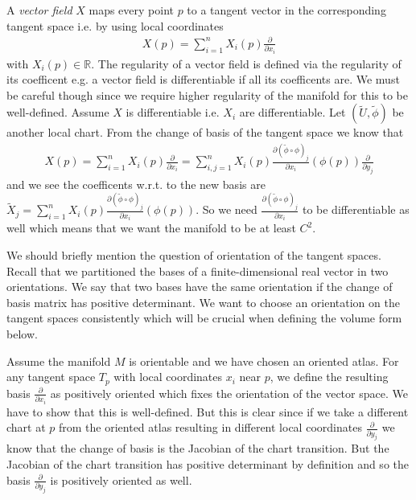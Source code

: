 \documentclass[12pt,a4paper]{article}
\numberwithin{equation}{subsection}
\numberwithin{lemma}{subsection}
\theoremstyle{definition}
\newcommand{\real}{\mathbb{R}}
\begin{document}
A \textit{vector field} $X$ maps every point $p$ to a tangent vector 
in the corresponding tangent space i.e. by using local coordinates
\begin{align*}
    X(p) = \sum_{i=1}^n X_i(p) \frac{\partial}{\partial x_i}
\end{align*}
with $X_i(p) \in \real$. The regularity of a vector field is defined via the
regularity of its coefficent e.g. a vector field is differentiable if 
all its coefficents are. We must be careful though since we require higher 
regularity of the manifold for this to be well-defined. 
Assume $X$ is differentiable i.e. $X_i$ are differentiable. 
Let $(\tilde{U}, \tilde{\phi})$ 
be another local chart.
From the 
change of basis of the tangent space we know that 
\begin{align*}
    X(p) = \sum_{i=1}^n X_i(p) \frac{\partial}{\partial x_i}
    = \sum_{i,j=1}^n X_i(p) \frac{\partial (\tilde{\phi} \circ \phi)_j}{\partial x_i}(\phi(p))
        \frac{\partial}{\partial y_j}
\end{align*}
and we see the coefficents w.r.t. to the new basis are 
$\tilde{X}_j = \sum_{i=1}^n X_i(p) \frac{\partial (\tilde{\phi} \circ \phi)_j}{\partial x_i}(\phi(p))$.
So we need $\frac{\partial (\tilde{\phi} \circ \phi)_j}{\partial x_i}$ to be 
differentiable as well which means that we want the manifold to be at least $C^2$.

We should briefly mention the question of orientation of the tangent spaces.
Recall that we partitioned the bases of a finite-dimensional real vector 
in two orientations. We say that two bases have the same 
orientation if the change of basis matrix has positive determinant.
We want to choose an orientation on the tangent spaces consistently which 
will be crucial when defining the volume form below.

Assume the manifold $M$ is orientable and we have chosen an oriented atlas.
For any tangent space $T_p$ with local coordinates $x_i$ near $p$, 
we define the resulting basis $\frac{\partial}{\partial x_i}$ as positively
oriented which fixes the orientation of the vector space. We have to show 
that this is well-defined. But this is clear since if we take a different 
chart at $p$ from the oriented atlas resulting in different local coordinates 
$\frac{\partial}{\partial y_j}$
we know that the change of 
basis is the Jacobian of the chart transition. But the Jacobian of the 
chart transition has positive determinant by definition and so the basis 
$\frac{\partial}{\partial y_j}$ is positively oriented as well.
\end{document}
